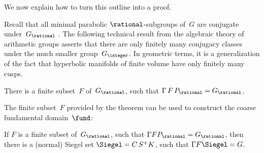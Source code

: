 We now explain how to turn this outline into a proof.

Recall that all minimal parabolic $\rational$-subgroups of~$G$ are conjugate under~$G_{\rational}$ . 
The following technical result from the algebraic theory of arithmetic groups asserts that there are only finitely many conjugacy classes under the much smaller group~$G_{\integer}$. In geometric terms, it is a generalization of the fact that hyperbolic manifolds of finite volume have only finitely many cusps.

\begin{thm} \label{GammaG/P}
There is a finite subset~$F$ of~$G_{\rational}$, such that\/ $\Gamma \, F \, P_{\rational} = G_{\rational}$.
\end{thm}

The finite subset~$F$ provided by the theorem can be used to construct the coarse fundamental domain~$\fund$:

\begin{thm} \label{GZFSiegel=G}
If $F$ is a finite subset of~$G_{\rational}$, such that\/ $\Gamma F P_{\rational} = G_{\rational}$, then there is a\/ \textup(normal\/\textup) Siegel set $\Siegel = C \, S^+ K$, such that\/ $\Gamma F \Siegel = G$.
\end{thm}

